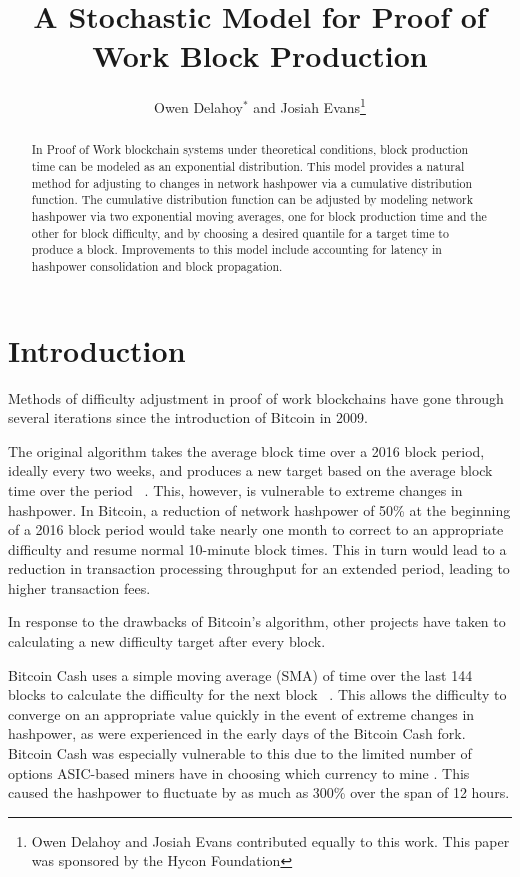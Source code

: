 \documentclass[]{article}
\title{A Stochastic Model for Proof of Work Block Production}
\author{Owen Delahoy$^*$ and Josiah Evans\footnote{Owen Delahoy and Josiah Evans contributed equally to this work. This paper was sponsored by the Hycon Foundation}}
\begin{document}
\maketitle


\begin{abstract}
In Proof of Work blockchain systems under theoretical conditions, block production time can be modeled as an exponential distribution.  This model provides a natural method for adjusting to changes in network hashpower via a cumulative distribution function.  The cumulative distribution function can be adjusted by modeling network hashpower via two exponential moving averages, one for block production time and the other for block difficulty, and by choosing a desired quantile for a target time to produce a block.  Improvements to this model include accounting for latency in hashpower consolidation and block propagation.     
\end{abstract}

\section{Introduction}
Methods of difficulty adjustment in proof of work blockchains have gone through several iterations since the introduction of Bitcoin in 2009.  
\newline

The original algorithm takes the average block time over a 2016 block period, ideally every two weeks, and produces a new target based on the average block time over the period ~\cite{BitcoinRetarget}.  This, however, is vulnerable to extreme changes in hashpower.  In Bitcoin, a reduction of network hashpower of 50\% at the beginning of a 2016 block period would take nearly one month to correct to an appropriate difficulty and resume normal 10-minute block times.  This in turn would lead to a reduction in transaction processing throughput for an extended period, leading to higher transaction fees.   
\newline

In response to the drawbacks of Bitcoin's algorithm, other projects have taken to calculating a new difficulty target after every block.   
\newline

Bitcoin Cash uses a simple moving average (SMA) of time over the last 144 blocks to calculate the difficulty for the next block ~\cite{Bitcoin-ABC}.  This allows the difficulty to converge on an appropriate value quickly in the event of extreme changes in hashpower, as were experienced in the early days of the Bitcoin Cash fork.  Bitcoin Cash was especially vulnerable to this due to the limited number of options ASIC-based miners have in choosing which currency to mine \cite{BitcoinCashMining}.  This caused the hashpower to fluctuate by as much as 300\% \cite{BitcoinCashDifficulty} over the span of 12 hours.   
\newline
\end{document}
